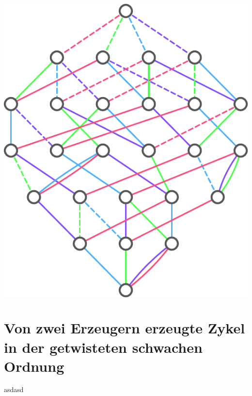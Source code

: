 \documentclass[%
  a4paper,%
  11pt,%
  blue,%
  ]{tubsartcl}
\begin{document}
\maketitle
\begin{center}
\includegraphics{../resources/twisted-weak-ordering-a4}
\end{center}
\newpage

\tableofcontents
\newpage

\section{Von zwei Erzeugern erzeugte Zykel in der getwisteten schwachen Ordnung}

asdasd
\end{document}
